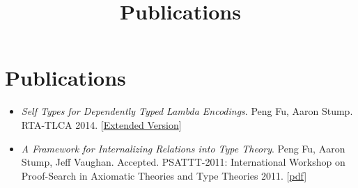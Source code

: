 \documentclass[10pt]{article}
\title{\bfseries\Large Publications}
\date{}
\begin{document}
\maketitle
\vspace{-4em}

\vspace{20pt}





\section*{Publications}

\begin{itemize}
\item \textit{Self Types for Dependently Typed Lambda Encodings}. Peng Fu, Aaron Stump. RTA-TLCA 2014. [\href{../../document/papers/rta-tlca.pdf}{Extended Version}]

\item \textit{A Framework for Internalizing Relations into Type Theory}. Peng Fu, Aaron Stump, Jeff Vaughan. Accepted. PSATTT-2011: International Workshop on Proof-Search in Axiomatic Theories and Type Theories 2011. [\href{../../document/papers/psattt-paper.pdf}{pdf}]
  
\end{itemize}
\end{document}
